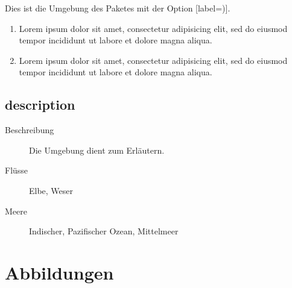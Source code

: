 Dies ist die  Umgebung des Paketes  mit der Option [label=)].

\begin{enumerate}[label=\alph{enumi})]
         \item Lorem ipsum dolor sit amet, consectetur adipisicing elit, sed do eiusmod tempor incididunt ut labore et dolore magna aliqua.
         \item Lorem ipsum dolor sit amet, consectetur adipisicing elit, sed do eiusmod tempor incididunt ut labore et dolore magna aliqua.
\end{enumerate}

\subsection{description}
%
\begin{description}
\item[Beschreibung] Die Umgebung  dient zum Erläutern.
\item[Flüsse] Elbe, Weser
\item[Meere] Indischer, Pazifischer Ozean, Mittelmeer
\end{description}

\section{Abbildungen}

